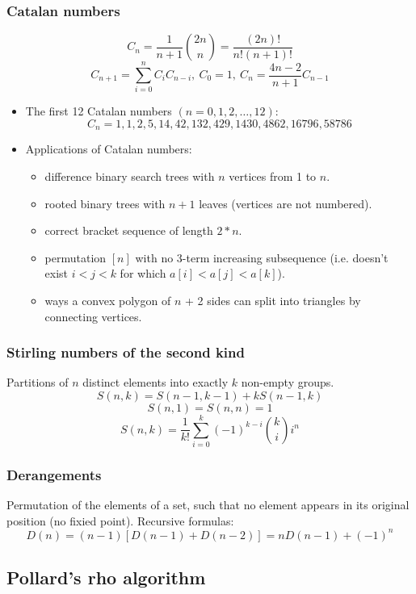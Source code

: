 \subsubsection{Catalan numbers}
\[ C_n = \frac{1}{n + 1} {2n \choose n} = \frac{(2n)!}{n!(n+1)!}\]
\[ C_{n + 1} = \displaystyle\sum_{i = 0}^{n}C_i C_{n - i},\ C_0 = 1,\ C_n = \frac{4n - 2}{n + 1}C_{n - 1}\]
\begin{itemize}
	\item The first 12 Catalan numbers $(n = 0, 1, 2, \ldots, 12)$: 
	\[ C_n = 1, 1, 2, 5, 14, 42, 132, 429, 1430, 4862, 16796, 58786 \]
	\item Applications of Catalan numbers:
	\begin{itemize}
		\item difference binary search trees with $n$ vertices from 1 to $n$. 
		\item rooted binary trees with $n + 1$ leaves (vertices are not numbered).
		\item correct bracket sequence of length $2 * n$.
		\item permutation $[n]$ with no 3-term increasing subsequence (i.e. doesn't exist $i < j < k$ for which $a[i] < a[j] < a[k]$).
		\item ways a convex polygon of $n$ + 2 sides can split into triangles by connecting vertices. 
	\end{itemize}
\end{itemize}

\subsubsection{Stirling numbers of the second kind}
Partitions of $n$ distinct elements into exactly $k$ non-empty groups.
\[ S(n, k) = S(n - 1, k - 1) + kS(n - 1, k)\]
\[ S(n, 1) = S(n, n) = 1 \]
\[ S(n, k) = \frac{1}{k!} \sum\limits_{i = 0}^{k} (-1)^{k - i} {k \choose i} i^n\]

\subsubsection{Derangements}
Permutation of the elements of a set, such that no element appears in its original position (no fixied point). Recursive formulas:
\[ D(n) = (n - 1)[D(n - 1) + D(n - 2)] = nD(n - 1) + (-1)^n\]

\subsection{Pollard's rho algorithm}
	